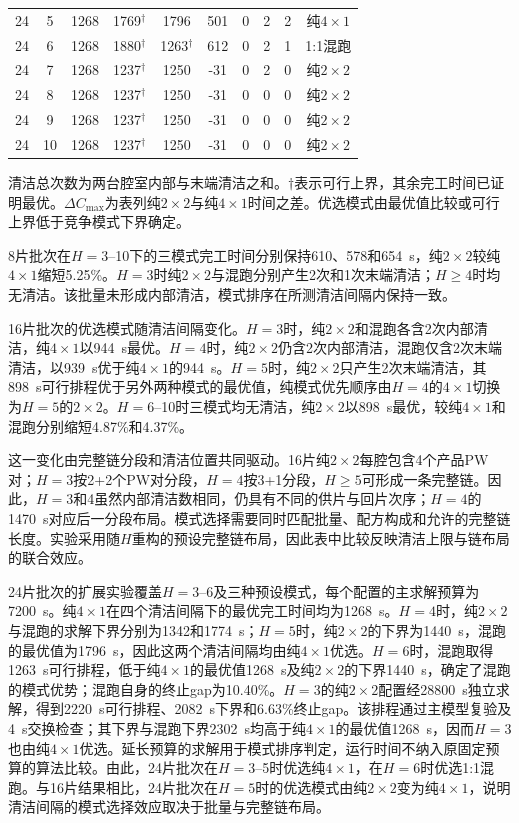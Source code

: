 \documentclass[journal]{IEEEtran}
\begin{document}
\begin{table}[tp]
\begin{tabular}{cccccccccc}
24 & 5 & 1268 & 1769$^{\dagger}$ & 1796 & 501 & 0 & 2 & 2 & 纯$4\times1$\\
24 & 6 & 1268 & 1880$^{\dagger}$ & 1263$^{\dagger}$ & 612 & 0 & 2 & 1 & 1:1混跑\\
24 & 7 & 1268 & 1237$^{\dagger}$ & 1250 & -31 & 0 & 2 & 0 & 纯$2\times2$\\
24 & 8 & 1268 & 1237$^{\dagger}$ & 1250 & -31 & 0 & 0 & 0 & 纯$2\times2$\\
24 & 9 & 1268 & 1237$^{\dagger}$ & 1250 & -31 & 0 & 0 & 0 & 纯$2\times2$\\
24 & 10 & 1268 & 1237$^{\dagger}$ & 1250 & -31 & 0 & 0 & 0 & 纯$2\times2$\\
\bottomrule
\end{tabular}
\par\smallskip
\parbox{0.95\textwidth}{\footnotesize 清洁总次数为两台腔室内部与末端清洁之和。$\dagger$表示可行上界，其余完工时间已证明最优。$\Delta C_{\max}$为表列纯$2\times2$与纯$4\times1$时间之差。优选模式由最优值比较或可行上界低于竞争模式下界确定。}
\end{table}

8片批次在$H=3$--10下的三模式完工时间分别保持610、578和654~s，纯$2\times2$较纯$4\times1$缩短5.25\%。$H=3$时纯$2\times2$与混跑分别产生2次和1次末端清洁；$H\ge4$时均无清洁。该批量未形成内部清洁，模式排序在所测清洁间隔内保持一致。

16片批次的优选模式随清洁间隔变化。$H=3$时，纯$2\times2$和混跑各含2次内部清洁，纯$4\times1$以944~s最优。$H=4$时，纯$2\times2$仍含2次内部清洁，混跑仅含2次末端清洁，以939~s优于纯$4\times1$的944~s。$H=5$时，纯$2\times2$只产生2次末端清洁，其898~s可行排程优于另外两种模式的最优值，纯模式优先顺序由$H=4$的$4\times1$切换为$H=5$的$2\times2$。$H=6$--10时三模式均无清洁，纯$2\times2$以898~s最优，较纯$4\times1$和混跑分别缩短4.87\%和4.37\%。

这一变化由完整链分段和清洁位置共同驱动。16片纯$2\times2$每腔包含4个产品PW对；$H=3$按2+2个PW对分段，$H=4$按3+1分段，$H\ge5$可形成一条完整链。因此，$H=3$和4虽然内部清洁数相同，仍具有不同的供片与回片次序；$H=4$的1470~s对应后一分段布局。模式选择需要同时匹配批量、配方构成和允许的完整链长度。实验采用随$H$重构的预设完整链布局，因此表中比较反映清洁上限与链布局的联合效应。

24片批次的扩展实验覆盖$H=3$--6及三种预设模式，每个配置的主求解预算为7200~s。纯$4\times1$在四个清洁间隔下的最优完工时间均为1268~s。$H=4$时，纯$2\times2$与混跑的求解下界分别为1342和1774~s；$H=5$时，纯$2\times2$的下界为1440~s，混跑的最优值为1796~s，因此这两个清洁间隔均由纯$4\times1$优选。$H=6$时，混跑取得1263~s可行排程，低于纯$4\times1$的最优值1268~s及纯$2\times2$的下界1440~s，确定了混跑的模式优势；混跑自身的终止gap为10.40\%。$H=3$的纯$2\times2$配置经28800~s独立求解，得到2220~s可行排程、2082~s下界和6.63\%终止gap。该排程通过主模型复验及4~s交换检查；其下界与混跑下界2302~s均高于纯$4\times1$的最优值1268~s，因而$H=3$也由纯$4\times1$优选。延长预算的求解用于模式排序判定，运行时间不纳入原固定预算的算法比较。由此，24片批次在$H=3$--5时优选纯$4\times1$，在$H=6$时优选1:1混跑。与16片结果相比，24片批次在$H=5$时的优选模式由纯$2\times2$变为纯$4\times1$，说明清洁间隔的模式选择效应取决于批量与完整链布局。
\end{document}
